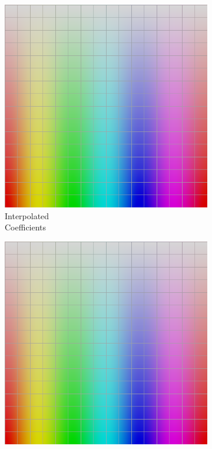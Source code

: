 \begin{figure}[t]
\begin{subfigure}[t]{0.22\textwidth}
		\includegraphics[width=\linewidth]{img/uplifting_texture_interpCoeff.png}
		\caption{Interpolated\\Coefficients}
		\label{fig:sigUpliftInterpCoeff}
	\end{subfigure} \hspace{0.05em}
	\begin{subfigure}[t]{0.22\textwidth}
		\includegraphics[width=\linewidth]{img/uplifting_texture_interpSpectra.png}

\end{subfigure}
\end{figure}
